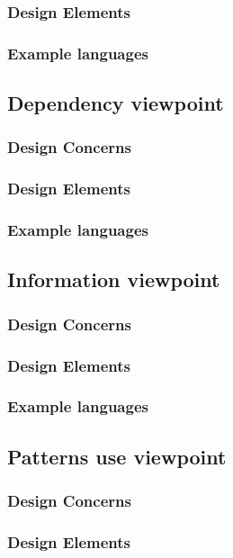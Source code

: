 \documentclass[onecolumn, draftclsnofoot,10pt, compsoc]{IEEEtran}
\begin{document}
\begin{singlespace}
		\subsubsection{Design Elements}
		\subsubsection{Example languages}
	\subsection{Dependency viewpoint}
		\subsubsection{Design Concerns}
		\subsubsection{Design Elements}
		\subsubsection{Example languages}
	\subsection{Information viewpoint}
		\subsubsection{Design Concerns}
		\subsubsection{Design Elements}
		\subsubsection{Example languages}
	\subsection{Patterns use viewpoint}
		\subsubsection{Design Concerns}
		\subsubsection{Design Elements}

\end{singlespace}
\end{document}
